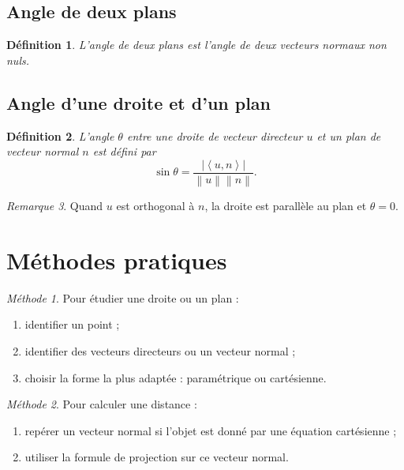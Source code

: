 \documentclass[11pt,a4paper]{article}
\newtheorem{definition}{Définition}[section]
\theoremstyle{remark}
\newtheorem{remarque}[definition]{Remarque}
\newtheorem*{methode}{Méthode}
\newcommand{\scal}[2]{\left\langle #1,#2\right\rangle}
\newcommand{\Norm}[1]{\left\|#1\right\|}
\newcommand{\abs}[1]{\left|#1\right|}
\begin{document}
\subsection{Angle de deux plans}

\begin{definition}
L’angle de deux plans est l’angle de deux vecteurs normaux non nuls.
\end{definition}

\subsection{Angle d’une droite et d’un plan}

\begin{definition}
L’angle \(\theta\) entre une droite de vecteur directeur \(u\) et un plan de vecteur normal \(n\) est défini par
\[
\sin\theta=\frac{\abs{\scal{u}{n}}}{\Norm{u}\Norm{n}}.
\]
\end{definition}

\begin{remarque}
Quand \(u\) est orthogonal à \(n\), la droite est parallèle au plan et \(\theta=0\).
\end{remarque}

\section{Méthodes pratiques}

\begin{methode}
Pour étudier une droite ou un plan :
\begin{enumerate}
    \item identifier un point ;
    \item identifier des vecteurs directeurs ou un vecteur normal ;
    \item choisir la forme la plus adaptée : paramétrique ou cartésienne.
\end{enumerate}
\end{methode}

\begin{methode}
Pour calculer une distance :
\begin{enumerate}
    \item repérer un vecteur normal si l’objet est donné par une équation cartésienne ;
    \item utiliser la formule de projection sur ce vecteur normal.
\end{enumerate}
\end{methode}
\end{document}
